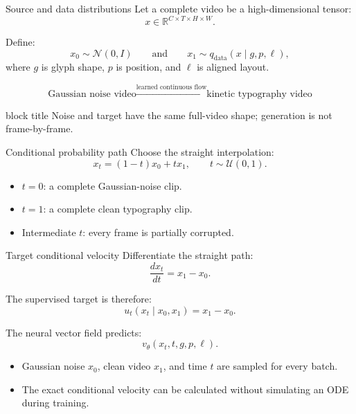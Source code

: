 \documentclass[aspectratio=169,xcolor=svgnames]{beamer}
\newcommand{\keypoint}[1]{%
\begin{center}
\begin{beamercolorbox}[rounded=true,shadow=true,wd=0.88\textwidth,sep=0.6em,center]{block title}
#1
\end{beamercolorbox}
\end{center}
}
\begin{document}
\begin{frame}{Source and data distributions}
Let a complete video be a high-dimensional tensor:
\[
x\in\mathbb{R}^{C\times T\times H\times W}.
\]

Define:
\[
x_0\sim\mathcal{N}(0,I)
\qquad\text{and}\qquad
x_1\sim q_{\mathrm{data}}(x\mid g,p,\ell),
\]
where $g$ is glyph shape, $p$ is position, and $\ell$ is aligned layout.

\begin{center}
\[
\text{Gaussian noise video}
\xrightarrow{\text{learned continuous flow}}
\text{kinetic typography video}
\]
\end{center}

\keypoint{Noise and target have the same full-video shape; generation is not frame-by-frame.}
\end{frame}

\begin{frame}{Conditional probability path}
Choose the straight interpolation:
\[
x_t=(1-t)x_0+t x_1,
\qquad t\sim\mathcal{U}(0,1).
\]

\begin{itemize}
    \item $t=0$: a complete Gaussian-noise clip.
    \item $t=1$: a complete clean typography clip.
    \item Intermediate $t$: every frame is partially corrupted.
\end{itemize}

\begin{center}
\end{center}
\end{frame}

\begin{frame}{Target conditional velocity}
Differentiate the straight path:
\[
\frac{d x_t}{dt}=x_1-x_0.
\]

The supervised target is therefore:
\[
u_t(x_t\mid x_0,x_1)=x_1-x_0.
\]

The neural vector field predicts:
\[
v_\theta(x_t,t,g,p,\ell).
\]

\begin{itemize}
    \item Gaussian noise $x_0$, clean video $x_1$, and time $t$ are sampled for every batch.
    \item The exact conditional velocity can be calculated without simulating an ODE during training.
\end{itemize}
\end{frame}
\end{document}
